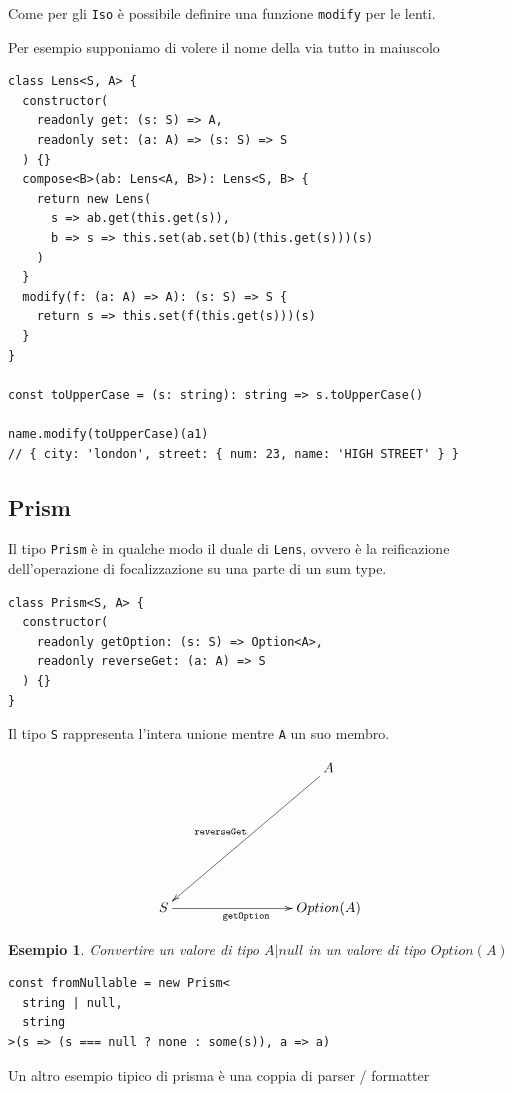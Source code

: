 \documentclass[12pt]{article}
\newtheorem{example}{Esempio}
\begin{document}
Come per gli \texttt{Iso} è possibile definire una funzione \texttt{modify} per le lenti.

Per esempio supponiamo di volere il nome della via tutto in maiuscolo

\begin{verbatim}
class Lens<S, A> {
  constructor(
    readonly get: (s: S) => A,
    readonly set: (a: A) => (s: S) => S
  ) {}
  compose<B>(ab: Lens<A, B>): Lens<S, B> {
    return new Lens(
      s => ab.get(this.get(s)),
      b => s => this.set(ab.set(b)(this.get(s)))(s)
    )
  }
  modify(f: (a: A) => A): (s: S) => S {
    return s => this.set(f(this.get(s)))(s)
  }
}

const toUpperCase = (s: string): string => s.toUpperCase()

name.modify(toUpperCase)(a1)
// { city: 'london', street: { num: 23, name: 'HIGH STREET' } }
\end{verbatim}

\subsection{Prism}

Il tipo \texttt{Prism} è in qualche modo il duale di \texttt{Lens}, ovvero è la reificazione dell'operazione di focalizzazione
su una parte di un sum type.

\begin{verbatim}
class Prism<S, A> {
  constructor(
    readonly getOption: (s: S) => Option<A>,
    readonly reverseGet: (a: A) => S
  ) {}
}
\end{verbatim}

Il tipo \texttt{S} rappresenta l'intera unione mentre \texttt{A} un suo membro.

\[
\xymatrixrowsep{3cm}
\xymatrixcolsep{3cm}
\xymatrix{
  & A \ar[dl]_{\texttt{reverseGet}} \\
  S \ar[r]_{\texttt{getOption}} & {Option(A)}
}
\]

\begin{example}
Convertire un valore di tipo $A | null$ in un valore di tipo $Option(A)$

\begin{verbatim}
const fromNullable = new Prism<
  string | null,
  string
>(s => (s === null ? none : some(s)), a => a)
\end{verbatim}

\end{example}

Un altro esempio tipico di prisma è una coppia di parser / formatter
\end{document}
